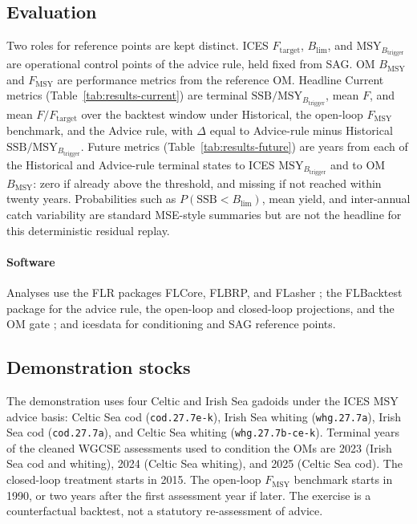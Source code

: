 \documentclass[11pt,a4paper]{article}
\newcommand{\Fmsy}{F_{\mathrm{MSY}}}
\newcommand{\Blim}{B_{\lim}}
\newcommand{\Btrig}{\mathrm{MSY}_{B_{\mathrm{trigger}}}}
\newcommand{\Bmsy}{B_{\mathrm{MSY}}}
\newcommand{\Ftar}{F_{\mathrm{target}}}
\begin{document}
\subsection{Evaluation}

Two roles for reference points are kept distinct. ICES $\Ftar$, $\Blim$,
and $\Btrig$ are operational control points of the advice rule, held
fixed from SAG. OM $\Bmsy$ and $\Fmsy$ are performance metrics from the
reference OM. Headline Current metrics (Table~\ref{tab:results-current})
are terminal $\mathrm{SSB}/\Btrig$, mean $F$, and mean $F/\Ftar$ over the
backtest window under Historical, the open-loop $\Fmsy$ benchmark, and
the Advice rule, with $\Delta$ equal to Advice-rule minus Historical
$\mathrm{SSB}/\Btrig$. Future metrics (Table~\ref{tab:results-future})
are years from each of the Historical and Advice-rule terminal states to
ICES $\Btrig$ and to OM $\Bmsy$: zero if already above the threshold, and
missing if not reached within twenty years. Probabilities such as
$P(\mathrm{SSB}<\Blim)$, mean yield, and inter-annual catch variability
are standard MSE-style summaries but are not the headline for this
deterministic residual replay.

\paragraph{Software}
Analyses use the FLR packages FLCore, FLBRP, and FLasher
\citep{Kell2007FLR}; the FLBacktest package for the advice rule, the
open-loop and closed-loop projections, and the OM gate
\citep{FLBacktestMethods}; and icesdata for conditioning and SAG
reference points.

\subsection{Demonstration stocks}
\label{sec:demo-stocks}

The demonstration uses four Celtic and Irish Sea gadoids under the ICES
MSY advice basis: Celtic Sea cod (\texttt{cod.27.7e-k}), Irish Sea
whiting (\texttt{whg.27.7a}), Irish Sea cod (\texttt{cod.27.7a}), and
Celtic Sea whiting (\texttt{whg.27.7b-ce-k}). Terminal years of the
cleaned WGCSE assessments used to condition the OMs are 2023 (Irish Sea
cod and whiting), 2024 (Celtic Sea whiting), and 2025 (Celtic Sea cod).
The closed-loop treatment starts in 2015. The open-loop $\Fmsy$ benchmark
starts in 1990, or two years after the first assessment year if later.
The exercise is a counterfactual backtest, not a statutory re-assessment
of advice.
\end{document}
